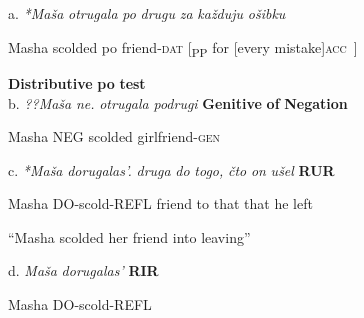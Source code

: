 \documentclass[output=paper,modfonts, nonflat]{langsci/langscibook}
\begin{document}
\begin{styleinnerExample}
\ea%
    \label{ex:key:55}
    \gll\\
        \\
    \glt
    \z

          a.  \textit{*Maša}  \textit{otrugala} \textit{po} \textit{drugu} \textit{za} \textit{každuju}             \textit{ošibku} 
\end{styleinnerExample}

\begin{styleinnerExample}
    Masha scolded  po friend-\textsc{dat} [\textsubscript{PP} for [every mistake]\textsc{acc~}]
\end{styleinnerExample}

\begin{styleinnerExample}
                \textbf{Distributive} \textbf{po} \textbf{test}\\
b.  \textit{??Maša}    \textit{ne.}    \textit{otrugala} \textit{podrugi}      \textbf{Genitive} \textbf{of} \textbf{Negation}
\end{styleinnerExample}

\begin{styleinnerExample}
        Masha NEG scolded   girlfriend-\textsc{gen\\
}
\end{styleinnerExample}

\begin{styleinnerExample}
  c.  \textit{*Maša}    \textit{dorugalas’.}         \textit{druga} \textit{do} \textit{togo,} \textit{čto}  \textit{on} \textit{ušel}                    \textbf{RUR}
\end{styleinnerExample}

\begin{styleinnerExample}
      Masha  DO-scold-REFL friend to  that  that  he left
\end{styleinnerExample}

\begin{styleinnerExample}
    “Masha scolded her friend into leaving”
\end{styleinnerExample}

\begin{styleinnerExample}
  d.  \textit{Maša}    \textit{dorugalas’}                       \textbf{RIR} \citep{Tatevosov2010}
\end{styleinnerExample}

\begin{styleinnerExample}
    Masha  DO-scold-REFL
\end{styleinnerExample}
\end{document}
